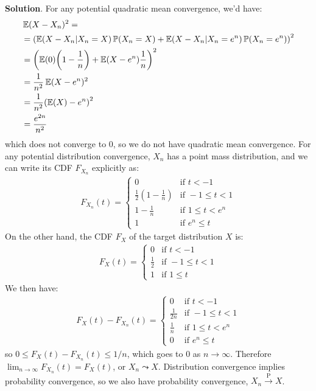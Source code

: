 \textbf{Solution}.
For any potential quadratic mean convergence, we'd have:
\begin{align*}
&\EXP(X - X_{n})^{2} = \\
& = \left(\EXP(X - X_{n} \middle| X_{n} = X)\PROB(X_{n} = X) + \EXP(X - X_{n} \middle| X_{n} = e^{n})\PROB(X_{n} = e^{n}) \right)^{2} \\
& = \left(\EXP(0)\left(1 - \frac{1}{n} \right) + \EXP(X - e^{n})\frac{1}{n} \right)^{2} \\
& = \frac{1}{n^{2}} \EXP(X - e^{n})^{2} \\
& = \frac{1}{n^{2}} \left( \EXP(X) - e^{n}  \right)^{2} \\
& = \frac{e^{2n}}{n^{2}}
\end{align*}
which does not converge to 0, so we do not have quadratic mean
convergence.
For any potential distribution convergence, \(X_{n}\) has a point mass
distribution, and we can write its CDF \(F_{X_{n}}\) explicitly as:
\begin{align*}  F_{X_{n}}(t) =
    \begin{cases}
      0   & \text{if } t < -1 \\
      \frac{1}{2} \left(1 - \frac{1}{n}\right) & \text{if } -1 \leq t < 1 \\
      1 - \frac{1}{n} & \text{if } 1 \leq t < e^{n} \\
      1 & \text{if } e^{n} \leq t
    \end{cases}       
\end{align*}
On the other hand, the CDF \(F_X\) of the target distribution \(X\) is:
\begin{align*}  F_X(t) =
    \begin{cases}
      0   & \text{if } t < -1 \\
      \frac{1}{2} & \text{if } -1 \leq t < 1 \\
      1 & \text{if } 1 \leq t
    \end{cases}       
\end{align*}
We then have:
\begin{align*}  F_X(t) - F_{X_{n}}(t) =
    \begin{cases}
      0   & \text{if } t < -1 \\
      \frac{1}{2n} & \text{if } -1 \leq t < 1 \\
      \frac{1}{n} & \text{if } 1 \leq t < e^{n} \\
      0 & \text{if } e^{n} \leq t
    \end{cases}       
\end{align*}
so \(0 \leq F_X(t) - F_{X_{n}}(t) \leq 1/n\), which goes to 0 as
\(n \rightarrow \infty\). Therefore
\(\lim _{n \rightarrow \infty} F_{X_{n}}(t) = F_X(t)\), or
\(X_{n} \leadsto X\).
Distribution convergence implies probability convergence, so we also
have probability convergence, \(X_{n} \xrightarrow{\textrm{P}} X\).

